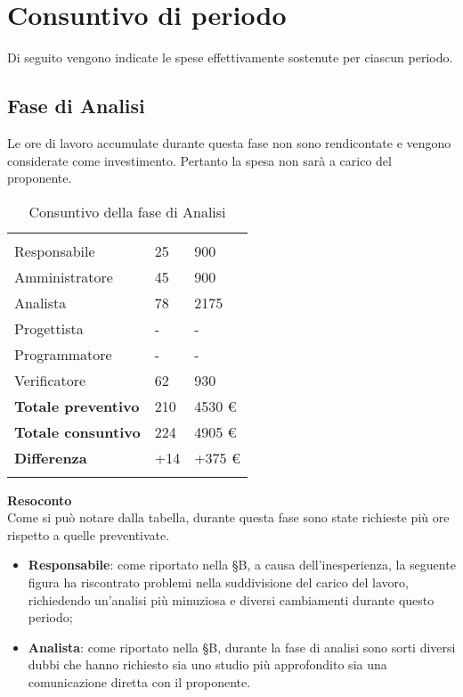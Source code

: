 \section{Consuntivo di periodo}

Di seguito vengono indicate le spese effettivamente sostenute per ciascun periodo.

\subsection{Fase di Analisi}

Le ore di lavoro accumulate durante questa fase non sono rendicontate e vengono considerate come investimento. Pertanto la spesa non sarà a carico del proponente.

\begin{longtable}{ C{4cm} C{3cm} C{3.5cm}} 
 	 &
 	 &
 	 \\
 	
 	Responsabile & 25  & 900 \\
 	Amministratore & 45 & 900\\
 	Analista & 78  & 2175 \\
 	Progettista & - & -\\
 	Programmatore & - & -\\
 	Verificatore & 62 & 930\\
 	
	\hline 	
 	
 	\textbf{Totale preventivo} &
	210 &
 	4530 € \\		
 	
 	\textbf{Totale consuntivo} &
	224 &
 	4905 € \\	
 	
 	\textbf{Differenza} &
	+14 &
 	+375 € \\	
 	
 	\caption{Consuntivo della fase di Analisi}
\end{longtable}

\textbf{Resoconto}\\
Come si può notare dalla tabella, durante questa fase sono state richieste più ore rispetto a quelle preventivate.
\begin{itemize}
\item \textbf{Responsabile}: come riportato nella \S B, a causa dell'inesperienza, la seguente figura ha riscontrato problemi nella suddivisione del carico del lavoro, richiedendo un'analisi più minuziosa e diversi cambiamenti durante questo periodo;
\item \textbf{Analista}: come riportato nella \S B, durante la fase di analisi sono sorti diversi dubbi che hanno richiesto sia uno studio più approfondito sia una comunicazione diretta con il proponente.
\end{itemize}

